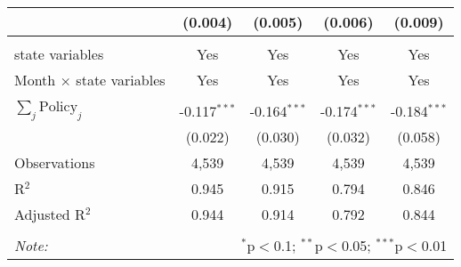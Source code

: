 \begin{tabular}{@{\extracolsep{1pt}}lcccc}
  & (0.004) & (0.005) & (0.006) & (0.009) \\ 
 \hline \\[-1.8ex] 
state variables & Yes & Yes & Yes & Yes \\ 
Month $\times$ state variables & Yes & Yes & Yes & Yes \\ 
\hline \\[-1.8ex] 
$\sum_j \mathrm{Policy}_j$ & -0.117$^{***}$ & -0.164$^{***}$ & -0.174$^{***}$ & -0.184$^{***}$ \\ 
 & (0.022) & (0.030) & (0.032) & (0.058) \\ 
Observations & 4,539 & 4,539 & 4,539 & 4,539 \\ 
R$^{2}$ & 0.945 & 0.915 & 0.794 & 0.846 \\ 
Adjusted R$^{2}$ & 0.944 & 0.914 & 0.792 & 0.844 \\ 
\hline 
\hline \\[-1.8ex] 
\textit{Note:}  & \multicolumn{4}{r}{$^{*}$p$<$0.1; $^{**}$p$<$0.05; $^{***}$p$<$0.01} \\ 
\end{tabular} 